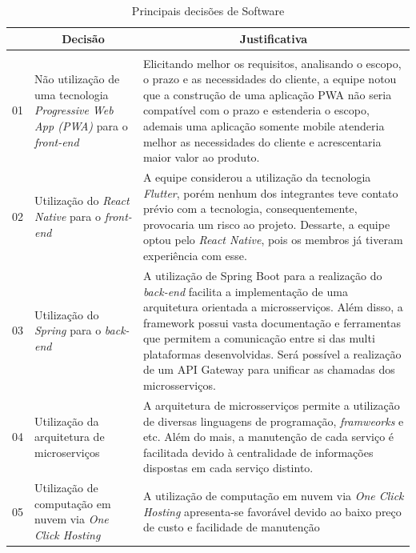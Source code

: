 \begin{apendicesenv}
\begin{table}[H]
    \centering
    \caption{Principais decisões de Software}
    \label{tab:decisoes_software}
    \begin{adjustbox}{max width = 1\textwidth}
        \begin{tabular}{|c|p{5cm}|p{10cm}|}
            \hline
            \rowcolor[HTML]{A8DADC}
            \multicolumn{1}{|c}{\textbf{\#}} &
            \multicolumn{1}{|c}{\textbf{Decisão}} & \multicolumn{1}{|c|}{\textbf{Justificativa}} \\ 
            \hline
            \rowcolor[HTML]{1D3557}\multicolumn{3}{|c|}{\textbf{\color{white}Ponto de Controle 1}} \\ \hline
            01 & Não utilização de uma tecnologia \textit{Progressive Web App (PWA)} para o \textit{front-end} & Elicitando melhor os requisitos, analisando o escopo, o prazo e as necessidades do cliente, a equipe notou que a construção de uma aplicação PWA não seria compatível com o prazo e estenderia o escopo, ademais uma aplicação somente mobile atenderia melhor as necessidades do cliente e acrescentaria maior valor ao produto.  \\ 
            \hline
            02 & Utilização do \textit{React Native} para o \textit{front-end} & A equipe considerou a utilização da tecnologia \textit{Flutter}, porém nenhum dos integrantes teve contato prévio com a tecnologia, consequentemente, provocaria um risco ao projeto. Dessarte, a equipe optou pelo \textit{React Native}, pois os membros já tiveram experiência com esse. \\ 
            \hline
            03 & Utilização do \textit{Spring} para o \textit{back-end} & A utilização de Spring Boot para a realização do \emph{back-end} facilita a implementação de uma arquitetura orientada a microsserviços. Além disso, a framework possui vasta documentação e ferramentas que permitem a comunicação entre si das multi plataformas desenvolvidas. Será possível a realização de um API Gateway para unificar as chamadas dos microsserviços. \\ 
            \hline
            04 & Utilização da arquitetura de microserviços & A arquitetura de microsserviços permite a utilização de diversas linguagens de programação, \textit{framweorks} e etc. Além do mais, a manutenção de cada serviço é facilitada devido à centralidade de informações dispostas em cada serviço distinto.\\ 
            \hline
            05 & Utilização de computação em nuvem via \textit{One Click Hosting}  & A utilização de computação em nuvem via \emph{One Click Hosting} apresenta-se favorável devido ao baixo preço de custo e facilidade de manutenção\\

\end{tabular}
\end{adjustbox}
\end{table}
\end{apendicesenv}
